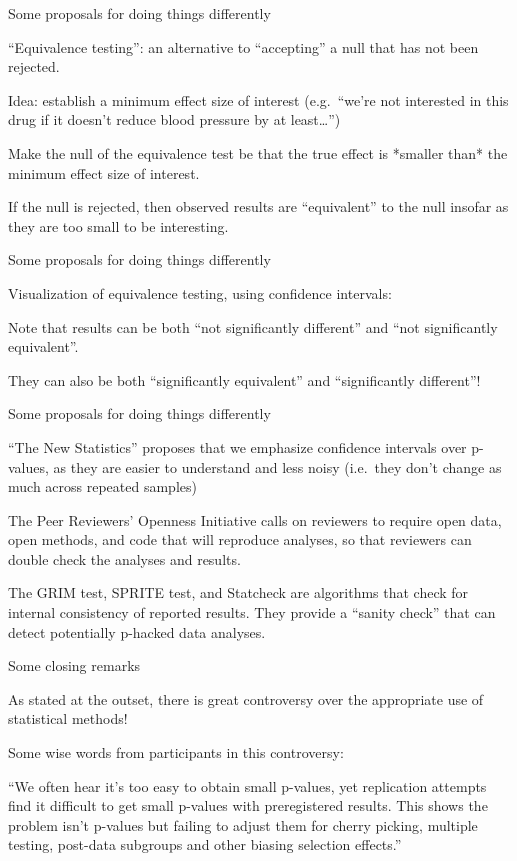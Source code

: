 \documentclass[
  letterpaper,
  DIV=11,
  numbers=noendperiod]{scrreprt}
\begin{document}
Some proposals for doing things differently

``Equivalence testing'': an alternative to ``accepting'' a null that has
not been rejected.

Idea: establish a minimum effect size of interest (e.g.~``we're not
interested in this drug if it doesn't reduce blood pressure by at
least\ldots{}'')

Make the null of the equivalence test be that the true effect is
*smaller than* the minimum effect size of interest.

If the null is rejected, then observed results are ``equivalent'' to the
null insofar as they are too small to be interesting.

Some proposals for doing things differently

Visualization of equivalence testing, using confidence intervals:

Note that results can be both ``not significantly different'' and ``not
significantly equivalent''.

They can also be both ``significantly equivalent'' and ``significantly
different''!

Some proposals for doing things differently

``The New Statistics'' proposes that we emphasize confidence intervals
over p-values, as they are easier to understand and less noisy
(i.e.~they don't change as much across repeated samples)

The Peer Reviewers' Openness Initiative calls on reviewers to require
open data, open methods, and code that will reproduce analyses, so that
reviewers can double check the analyses and results.

The GRIM test, SPRITE test, and Statcheck are algorithms that check for
internal consistency of reported results. They provide a ``sanity
check'' that can detect potentially p-hacked data analyses.

Some closing remarks

As stated at the outset, there is great controversy over the appropriate
use of statistical methods!

Some wise words from participants in this controversy:

``We often hear it's too easy to obtain small p-values, yet replication
attempts find it difficult to get small p-values with preregistered
results. This shows the problem isn't p-values but failing to adjust
them for cherry picking, multiple testing, post-data subgroups and other
biasing selection effects.''
\end{document}
